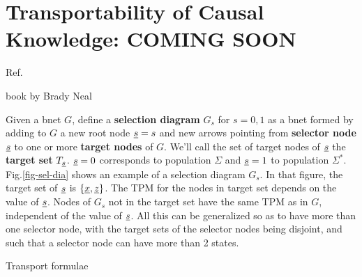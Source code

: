 \chapter{Transportability
of Causal Knowledge: COMING SOON}
\label{ch-transport}





Ref.\cite{pearl2011trans}

book by Brady Neal \cite{book-brady-neal}



Given a bnet $G$, define a
{\bf selection diagram} $G_s$ for $s=0,1$
as a bnet 
formed by adding to $G$ a new root node ${\underline{s}}=s$
and new arrows pointing
from {\bf selector node}
${\underline{s}}$ to one
or more {\bf target nodes} of $G$.
We'll call the set 
of target nodes 
of ${\underline{s}}$ the {\bf target set} $T_{\underline{s}}$.
${\underline{s}}=0$ corresponds to population $\Sigma$
and ${\underline{s}}=1$ to population $\Sigma^*$.
Fig.\ref{fig-sel-dia}
shows an example
of a selection diagram $G_s$.
In that figure, the target set 
of ${\underline{s}}$ is 
$\{{\underline{x}}, {\underline{z}}\}$.
The TPM for the nodes in target set 
depends on the value of ${\underline{s}}$.
Nodes of $G_s$ not in
the target set have the same TPM as in $G$,
independent of the value of ${\underline{s}}$.
All this can be generalized so as to 
have more than one selector node,
with the target sets
of the selector nodes being disjoint, and such that a
selector node
can have more than 2 states.

Transport formulae

